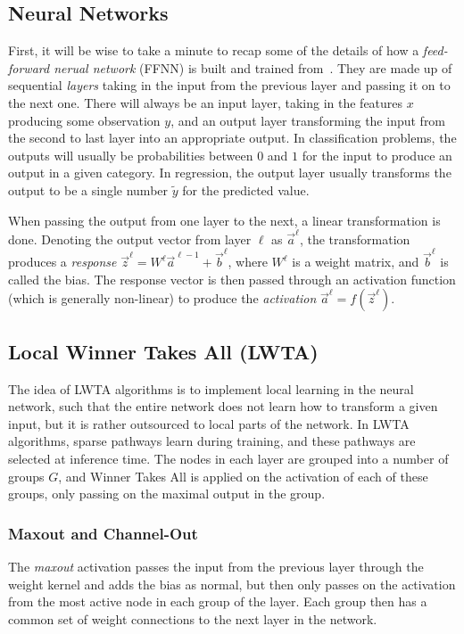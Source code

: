      

\subsection{Neural Networks}
    First, it will be wise to take a minute to recap some of the details of how a \textit{feed-forward nerual network} (FFNN) is built and trained from~\cite{Project2}. They are made up of sequential \textit{layers} taking in the input from the previous layer and passing it on to the next one. There will always be an input layer, taking in the features $x$ producing some observation $y$, and an output layer transforming the input from the second to last layer into an appropriate output. In classification problems, the outputs will usually be probabilities between $0$ and $1$ for the input to produce an output in a given category. In regression, the output layer usually transforms the output to be a single number $\tilde{y}$ for the predicted value.

    When passing the output from one layer to the next, a linear transformation is done. Denoting the output vector from layer $\ell$ as $\vec{a}^\ell$, the transformation produces a \textit{response} $\vec{z}^{\ell} = W^\ell \vec{a}^{\ell-1} + \vec{b}^\ell$, where $W^\ell$ is a weight matrix, and $\vec{b}^\ell$ is called the bias. The response vector is then passed through an activation function (which is generally non-linear) to produce the \textit{activation} $\vec{a}^\ell = f(\vec{z}^\ell)$.

\subsection{Local Winner Takes All (LWTA)}
    The idea of LWTA algorithms is to implement local learning in the neural network, such that the entire network does not learn how to transform a given input, but it is rather outsourced to local parts of the network. In LWTA algorithms, sparse pathways learn during training, and these pathways are selected at inference time. The nodes in each layer are grouped into a number of groups $G$, and Winner Takes All is applied on the activation of each of these groups, only passing on the maximal output in the group.

    \subsubsection{Maxout and Channel-Out}
        The \textit{maxout} activation passes the input from the previous layer through the weight kernel and adds the bias as normal, but then only passes on the activation from the most active node in each group of the layer. Each group then has a common set of weight connections to the next layer in  the network.

